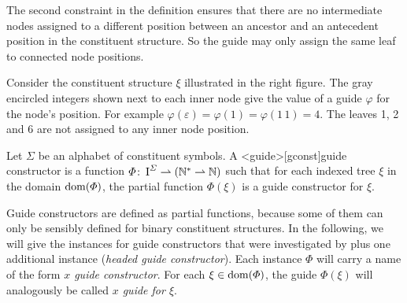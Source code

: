 \documentclass[../../document.tex]{subfiles}
\begin{document}
    The second constraint in the definition ensures that there are no intermediate nodes assigned to a different position between an ancestor and an antecedent position in the constituent structure.
    So the guide may only assign the same leaf to connected node positions.

    \bigskip\noindent
    \begin{minipage}[t]{.7\linewidth}
        \parexample*
        Consider the constituent structure \(\xi\) illustrated in the right figure.
        The gray encircled integers shown next to each inner node give the value of a guide \(\varphi\) for the node's position.
        For example \(\varphi(\varepsilon) = \varphi(1) = \varphi(1\,1) = 4\).
        The leaves 1, 2 and 6 are not assigned to any inner node position.
    \end{minipage}
    \hfill
    


    \begin{definition}
        Let \(\varSigma\) be an alphabet of constituent symbols.
        A <guide>[gconst]{guide constructor} is a function \(\varPhi\colon \operatorname{I}^\varSigma \rightharpoonup (\mathbb{N}^* \rightharpoonup \mathbb{N})\) such that for each indexed tree \(\xi\) in the domain \(\operatorname{dom}(\varPhi)\), the partial function \(\varPhi(\xi)\) is a guide constructor for \(\xi\).
    \end{definition}

    Guide constructors are defined as partial functions, because some of them can only be sensibly defined for binary constituent structures.
    In the following, we will give the instances for guide constructors that were investigated by \citet{Rup22} plus one additional instance (\emph{headed guide constructor}).
    Each instance \(\varPhi\) will carry a name of the form \emph{\(x\) guide constructor}.
    For each \(\xi \in \operatorname{dom}(\varPhi)\), the guide \(\varPhi(\xi)\) will analogously be called \emph{\(x\) guide for \(\xi\)}.
\end{document}
